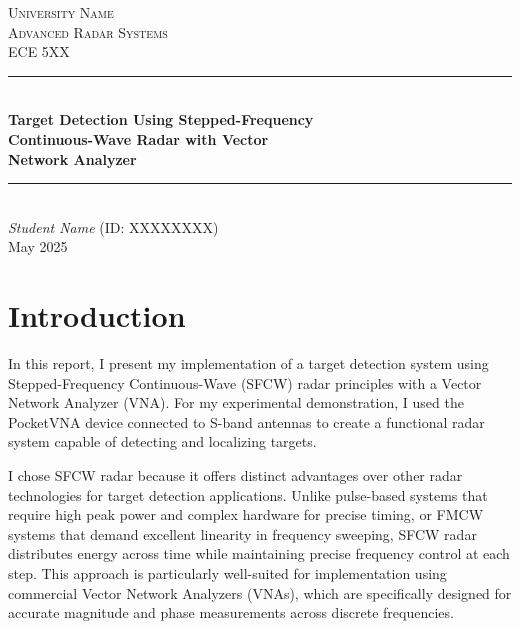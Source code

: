 \documentclass[11pt,a4paper]{article}
\begin{document}
\begin{titlepage}
\newcommand{\HRule}{\rule{\linewidth}{0.5mm}}

\center 
 
\textsc{\LARGE University Name}\\[1cm]

\textsc{\Large Advanced Radar Systems}\\[0.2cm]
\textsc{\large ECE 5XX}\\[1cm] 									

\HRule \\[0.8cm]
{ \huge \bfseries \huge{Target Detection Using Stepped-Frequency\\Continuous-Wave Radar with Vector\\Network Analyzer}}\\[0.7cm]						

\HRule \\[2cm]

\large
\emph{Student Name}
 (ID: XXXXXXXX)\\[1cm]


{\large May 2025}\\[3cm]
\vfill 
\end{titlepage}

\tableofcontents
\newpage

\section{Introduction}

In this report, I present my implementation of a target detection system using Stepped-Frequency Continuous-Wave (SFCW) radar principles with a Vector Network Analyzer (VNA). For my experimental demonstration, I used the PocketVNA device connected to S-band antennas to create a functional radar system capable of detecting and localizing targets.

I chose SFCW radar because it offers distinct advantages over other radar technologies for target detection applications. Unlike pulse-based systems that require high peak power and complex hardware for precise timing, or FMCW systems that demand excellent linearity in frequency sweeping, SFCW radar distributes energy across time while maintaining precise frequency control at each step. This approach is particularly well-suited for implementation using commercial Vector Network Analyzers (VNAs), which are specifically designed for accurate magnitude and phase measurements across discrete frequencies.
\end{document}
